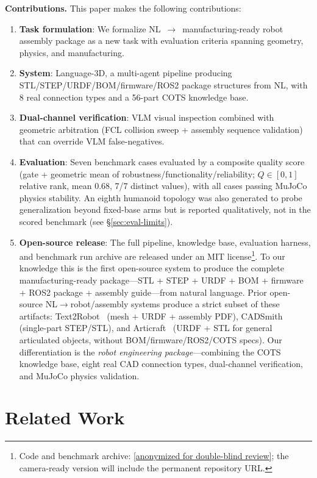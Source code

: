 \documentclass[conference]{IEEEtran}
\begin{document}
\textbf{Contributions.} This paper makes the following contributions:
\begin{enumerate}
    \item \textbf{Task formulation}: We formalize NL~$\to$~manufacturing-ready robot assembly package as a new task with evaluation criteria spanning geometry, physics, and manufacturing.
    \item \textbf{System}: Language-3D, a multi-agent pipeline producing STL/STEP/URDF/BOM/firmware/ROS2 package structures from NL, with 8 real connection types and a 56-part COTS knowledge base.
    \item \textbf{Dual-channel verification}: VLM visual inspection combined with geometric arbitration (FCL collision sweep + assembly sequence validation) that can override VLM false-negatives.
    \item \textbf{Evaluation}: Seven benchmark cases evaluated by a composite quality score (gate + geometric mean of robustness/functionality/reliability; $Q\in[0,1]$ relative rank, mean 0.68, 7/7 distinct values), with all cases passing MuJoCo physics stability. An eighth humanoid topology was also generated to probe generalization beyond fixed-base arms but is reported qualitatively, not in the scored benchmark (see \S\ref{sec:eval-limits}).
    \item \textbf{Open-source release}: The full pipeline, knowledge base, evaluation harness, and benchmark run archive are released under an MIT license\footnote{Code and benchmark archive: \url{[anonymized for double-blind review]}; the camera-ready version will include the permanent repository URL.}. To our knowledge this is the first open-source system to produce the complete manufacturing-ready package---STL + STEP + URDF + BOM + firmware + ROS2 package + assembly guide---from natural language. Prior open-source NL$\to$robot/assembly systems produce a strict subset of these artifacts: Text2Robot~\cite{text2robot2025} (mesh + URDF + assembly PDF), CADSmith~\cite{cadsmith2026} (single-part STEP/STL), and Articraft~\cite{articraft2026} (URDF + STL for general articulated objects, without BOM/firmware/ROS2/COTS specs). Our differentiation is the \emph{robot engineering package}---combining the COTS knowledge base, eight real CAD connection types, dual-channel verification, and MuJoCo physics validation.
\end{enumerate}

\section{Related Work}
\label{sec:related}
\end{document}

